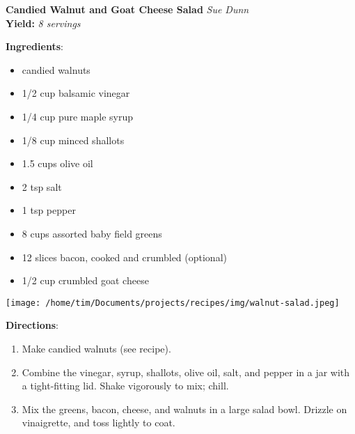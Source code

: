 \documentclass[11pt, twoside, openany]{book}
\begin{document}
\noindent\begin{minipage}[t]{\linewidth}%
{\Large\textbf{Candied Walnut and Goat Cheese Salad}} \label{candied-walnut-and-goat-cheese-salad}\hfill\textit{Sue Dunn}\\
\textbf{Yield:} \textit{8 servings}\\
\noindent\begin{minipage}[t]{0.78\linewidth}%
\textbf{Ingredients}:\vspace{-3mm}
\begin{multicols}{2}
\begin{itemize}\setlength\itemsep{-1mm}
\item candied walnuts
\item 1/2 cup balsamic vinegar
\item 1/4 cup pure maple syrup
\item 1/8 cup minced shallots
\item 1.5 cups olive oil
\item 2 tsp salt
\item 1 tsp pepper
\item 8 cups assorted baby field greens
\item 12 slices bacon, cooked and crumbled (optional)
\item 1/2 cup crumbled goat cheese
\end{itemize}
\end{multicols}
\end{minipage}
\noindent\begin{minipage}[t]{0.18\linewidth}
\centering \strut\vspace*{-\baselineskip}\newline
\texttt{[image: /home/tim/Documents/projects/recipes/img/walnut-salad.jpeg]}\\
\end{minipage}\vspace{3mm}
\textbf{Directions}:
\vspace{-3mm}\begin{enumerate}\setlength\itemsep{-1mm}
\item Make candied walnuts (see recipe).
\item Combine the vinegar, syrup, shallots, olive oil, salt, and pepper in a jar with a tight-fitting lid. Shake vigorously to mix; chill.
\item Mix the greens, bacon, cheese, and walnuts in a large salad bowl. Drizzle on vinaigrette, and toss lightly to coat.
\end{enumerate}
\end{minipage}\vspace{8mm}
\end{document}
